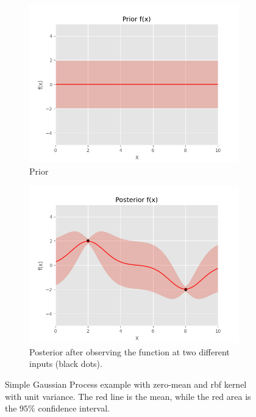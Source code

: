 \begin{figure}[h]
    \centering
    \begin{subfigure}{0.49\textwidth}
        \includegraphics[width=\textwidth]{figures/introduction-gp/prior.png}
        \caption{Prior}
        \label{fig:gp_prior}
    \end{subfigure}
    \begin{subfigure}{0.49\textwidth}
        \includegraphics[width=\textwidth]{figures/introduction-gp/posterior.png}
        \caption{Posterior after observing the function at two different inputs (black dots).}
        \label{fig:gp_posterior}
    \end{subfigure}
    \caption{Simple Gaussian Process example with zero-mean and \acrshort{rbf} kernel with unit variance. The red line is the mean, while the red area is the $95\%$ confidence interval.}
    \label{fig:gp_simple}
\end{figure}

